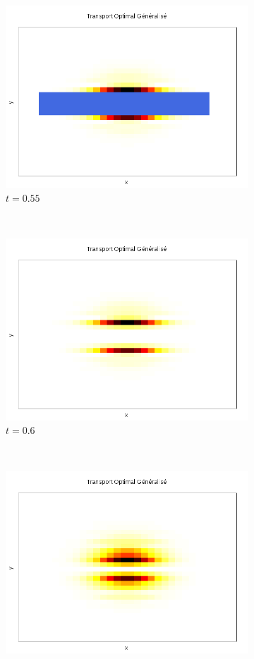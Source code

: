 \documentclass[a4paper,12pt]{article}
\begin{document}
\begin{figure}
\begin{subfigure}[b]{0.18\linewidth}
\includegraphics[width=\linewidth]{img/2DObstacle/T_00018.png}
\caption{$t=0.55$}
\end{subfigure}
~
\begin{subfigure}[b]{0.18\linewidth}
\includegraphics[width=\linewidth]{img/2DObstacle/T_00021.png}
\caption{$t=0.6$}
\end{subfigure}
~
\begin{subfigure}[b]{0.18\linewidth}
\includegraphics[width=\linewidth]{img/2DObstacle/T_00028.png}

\end{subfigure}
\end{figure}
\end{document}
